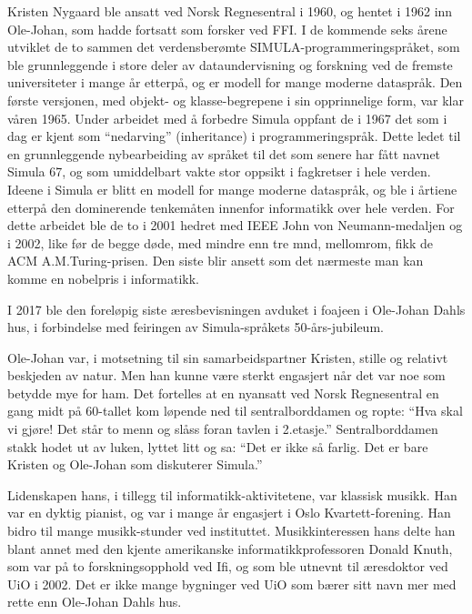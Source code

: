 \documentclass[../../main.tex]{subfiles}
\begin{document}
Kristen Nygaard ble ansatt ved Norsk Regnesentral i 1960, og hentet i 1962 inn Ole-Johan, som hadde fortsatt som forsker ved FFI. I de kommende seks årene utviklet de to sammen det verdensberømte SIMULA-programmeringspråket, som ble grunnleggende i store deler av dataundervisning og forskning ved de fremste universiteter i mange år etterpå, og er modell for mange moderne dataspråk. Den første versjonen, med objekt- og klasse-begrepene i sin opprinnelige form, var klar våren 1965. Under arbeidet med å forbedre Simula oppfant de i 1967 det som i dag er kjent som ``nedarving'' (inheritance) i programmeringspråk. Dette ledet til en grunnleggende nybearbeiding av språket til det som senere har fått navnet Simula 67, og som umiddelbart vakte stor oppsikt i fagkretser i hele verden. Ideene i Simula er blitt en modell for mange moderne dataspråk, og ble i årtiene etterpå den dominerende tenkemåten innenfor informatikk over hele verden. For dette arbeidet ble de to i 2001 hedret med IEEE John von Neumann-medaljen og i 2002, like før de begge døde, med mindre enn tre mnd, mellomrom, fikk de ACM A.M.Turing-prisen. Den siste blir ansett som det nærmeste man kan komme en nobelpris i informatikk.


I 2017 ble den foreløpig siste æresbevisningen avduket i foajeen i Ole-Johan Dahls hus, i forbindelse med feiringen av Simula-språkets 50-års-jubileum.

Ole-Johan var, i motsetning til sin samarbeidspartner Kristen, stille og relativt beskjeden av natur. Men han kunne være sterkt engasjert når det var noe som betydde mye for ham. Det fortelles at en nyansatt ved Norsk Regnesentral en gang midt på 60-tallet kom løpende ned til sentralborddamen og ropte: ``Hva skal vi gjøre! Det står to menn og slåss foran tavlen i 2.etasje.'' Sentralborddamen stakk hodet ut av luken, lyttet litt og sa: ``Det er ikke så farlig. Det er bare Kristen og Ole-Johan som diskuterer Simula.''

Lidenskapen hans, i tillegg til informatikk-aktivitetene, var klassisk musikk. Han var en dyktig pianist, og var i mange år engasjert i Oslo Kvartett-forening. Han bidro til mange musikk-stunder ved instituttet. Musikkinteressen hans delte han blant annet med den kjente amerikanske informatikkprofessoren Donald Knuth, som var på to forskningsopphold ved Ifi, og som ble utnevnt til æresdoktor ved UiO i 2002.
Det er ikke mange bygninger ved UiO som bærer sitt navn mer med rette enn Ole-Johan Dahls hus. 

\end{document}
